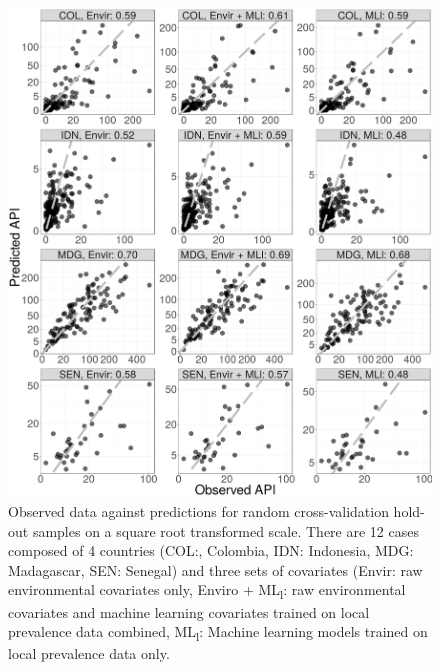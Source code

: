 \documentclass[review]{elsarticle}
\begin{document}
\begin{figure}
  \includegraphics[width=\textwidth]{figs/cv1_l_scatter.png}
\caption{
  Observed data against predictions for random cross-validation hold-out samples on a square root transformed scale. 
  There are 12 cases composed of 4 countries (COL:, Colombia, IDN: Indonesia, MDG: Madagascar, SEN: Senegal) and three sets of covariates (Envir: raw environmental covariates only, Enviro +  ML\textsubscript{l}: raw environmental covariates and machine learning covariates trained on local prevalence data combined, ML\textsubscript{l}: Machine learning models trained on local prevalence data only.
}
\label{f:scatter1}
\end{figure}
\end{document}
